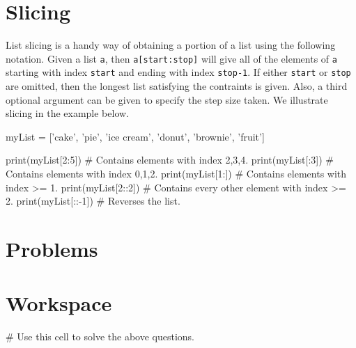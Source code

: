 \documentclass{ximera}
\begin{document}
\section{Slicing}

List slicing is a handy way of obtaining a portion of a list using the following notation. Given a list \verb|a|, then \verb|a[start:stop]| will give all of the elements of \verb|a| starting with index \verb|start| and ending with index \verb|stop-1|. If either \verb|start| or \verb|stop| are omitted, then the longest list satisfying the contraints is given. Also, a third optional argument can be given to specify the step size taken. We illustrate slicing in the example below.

\begin{sageCell}
myList = ['cake', 'pie', 'ice cream', 'donut', 'brownie', 'fruit']

print(myList[2:5])  # Contains elements with index 2,3,4.
print(myList[:3])   # Contains elements with index 0,1,2.
print(myList[1:])   # Contains elements with index >= 1.
print(myList[2::2]) # Contains every other element with index >= 2.
print(myList[::-1]) # Reverses the list.
\end{sageCell}

\section{Problems}

\begin{question}
\end{question}

\begin{question}
\end{question}

\section{Workspace}

\begin{sageCell}
# Use this cell to solve the above questions.
\end{sageCell}
\end{document}
